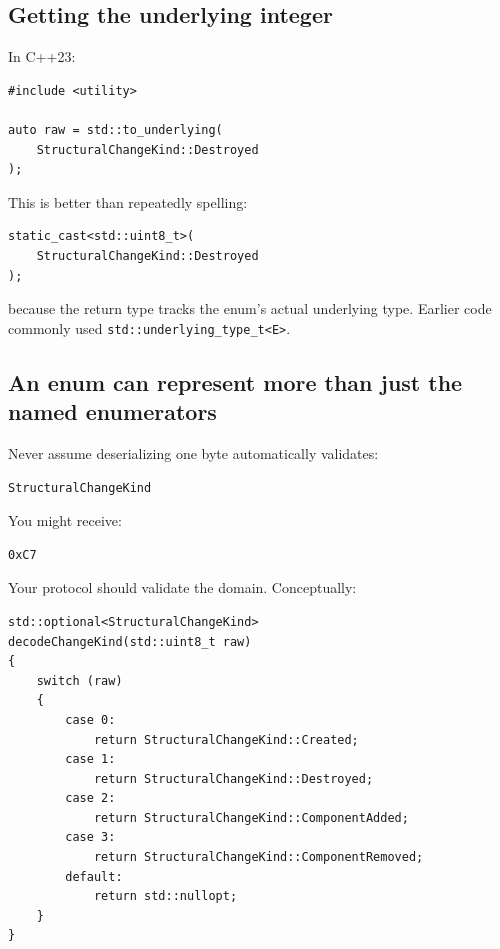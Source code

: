 \subsection{Getting the underlying integer}\label{05-engine-i-ch003-getting-the-underlying-integer}

In C++23:

\begin{verbatim}
#include <utility>

auto raw = std::to_underlying(
    StructuralChangeKind::Destroyed
);
\end{verbatim}

This is better than repeatedly spelling:

\begin{verbatim}
static_cast<std::uint8_t>(
    StructuralChangeKind::Destroyed
);
\end{verbatim}

because the return type tracks the enum's actual underlying type. Earlier code commonly used \texttt{std::underlying\_type\_t\textless{}E\textgreater{}}.

\subsection{An enum can represent more than just the named enumerators}\label{05-engine-i-ch003-an-enum-can-represent-more-than-just-the-named-enumerators}

Never assume deserializing one byte automatically validates:

\begin{verbatim}
StructuralChangeKind
\end{verbatim}

You might receive:

\begin{verbatim}
0xC7
\end{verbatim}

Your protocol should validate the domain. Conceptually:

\begin{verbatim}
std::optional<StructuralChangeKind>
decodeChangeKind(std::uint8_t raw)
{
    switch (raw)
    {
        case 0:
            return StructuralChangeKind::Created;
        case 1:
            return StructuralChangeKind::Destroyed;
        case 2:
            return StructuralChangeKind::ComponentAdded;
        case 3:
            return StructuralChangeKind::ComponentRemoved;
        default:
            return std::nullopt;
    }
}
\end{verbatim}

